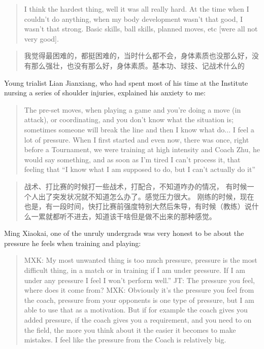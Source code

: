 \begin{CJK}{UTF8}{gbsn}
\begin{quotation}
    I think the hardest thing, well it was all really hard.  At the time when I couldn't do anything, when my body development wasn't that good, I wasn't that strong.  Basic skills, ball skills, planned moves, etc [were all not very good].
\end{quotation}

\begin{quotation}
    我觉得最困难的，都挺困难的，当时什么都不会，身体素质也没那么好，没有那么强壮，也没有那么好，身体素质。基本功、球技、记战术什么的 
\end{quotation}

Young trialist Lian Jianxiang, who had spent most of his time at the Institute nursing a series of shoulder injuries, explained his anxiety to me:

    \begin{quotation}
      The pre-set moves, when playing a game and you’re doing a move (in attack), or coordinating, and you don’t know what the situation is; sometimes someone will break the line and then I know what do... I feel a lot of pressure.  When I first started and even now, there was once, right before a Tournament, we were training at high intensity and Coach Zhu, he would say something, and as soon as I'm tired I can't process it, that feeling that ``I know what I am supposed to do, but I can't actually do it''
    \end{quotation}

    \begin{quotation}
      战术、打比赛的时候打一些战术，打配合，不知道咋办的情况， 有时候一个人出了突发状况就不知道怎么办了。感觉压力很大。 刚练的时候，现在也是，有一段时间，快打比赛前强度特别大然后朱导，有时候（教练）说什么一累就都听不进去，知道该干啥但是做不出来的那种感觉。
    \end{quotation}

Ming Xiaokai, one of the unruly undergrads was very honest to be about the pressure he feels when training and playing:

    \begin{quotation}
      MXK: My most unwanted thing is too much pressure, pressure is the most difficult thing, in a match or in training if I am under pressure.  If I am under any pressure I feel I won’t perform well.”
      JT: The pressure you feel, where does it come from?
      MXK: Obviously it's the pressure you feel from the coach, pressure from your opponents is one type of pressure, but I am able to use that as a motivation. But if for example the coach gives you added pressure, if the coach gives you a requirement, and you need to on the field, the more you think about it the easier it becomes to make mistakes.  I feel like the pressure from the Coach is relatively big.
    \end{quotation}


\end{CJK}
